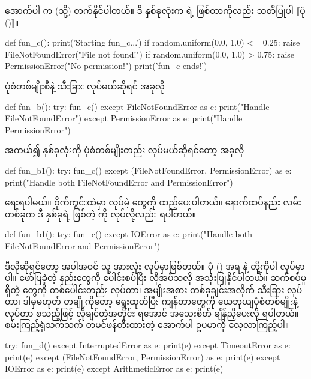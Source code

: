 အောက်ပါ  က  (သို့)  တက်နိုင်ပါတယ်။ ဒီ  နှစ်ခုလုံးက  ရဲ့  ဖြစ်တာကိုလည်း သတိပြုပါ $\big\llbracket$ပုံ (\fRefNo{\ref{fig:exceptionhier}})$\big\rrbracket$။
%
\begin{py}
def fun_c():
    print('Starting fun_c...')
    if random.uniform(0.0, 1.0) <= 0.25:
        raise FileNotFoundError("File not found!")
    if random.uniform(0.0, 1.0) > 0.75:
        raise PermissionError("No permission!")
    print('fun_c ends!')
\end{py}
%
ပုံစံတစ်မျိုးစီနဲ့ သီးခြား  လုပ်မယ်ဆိုရင် အခုလို 
%
\begin{py}
def fun_b():
    try:
        fun_c()
    except FileNotFoundError as e:
        print("Handle FileNotFoundError")
    except PermissionError as e:
        print("Handle PermissionError")
\end{py}
%
အကယ်၍  နှစ်ခုလုံးကို ပုံစံတစ်မျိုးတည်း  လုပ်မယ်ဆိုရင်တော့ အခုလို
%
\begin{py}
def fun_b1():
    try:
        fun_c()
    except (FileNotFoundError, PermissionError) as e:
        print("Handle both FileNotFoundError and PermissionError")
\end{py}
%
ရေးရပါမယ်။ ဝိုက်ကွင်းထဲမှာ  လုပ်မဲ့  တွေကို ထည့်ပေးပါတယ်။ နောက်ထပ်နည်း လမ်းတစ်ခုက ဒီ  နှစ်ခုရဲ့  ဖြစ်တဲ့  ကို  လုပ်လို့လည်း ရပါတယ်။
%
\begin{py}
def fun_b1():
    try:
        fun_c()
    except IOError as e:
        print("Handle both FileNotFoundError and PermissionError")
\end{py}
%
ဒီလိုဆိုရင်တော့  အပါအဝင် သူ့   အားလုံး  လုပ်မှာဖြစ်တယ်။ ပုံ (\fRefNo{\ref{fig:exceptionhier}})  အရ  နဲ့  တို့ကိုပါ  လုပ်မှာပါ။ ဖော်ပြခဲ့တဲ့  နည်းတွေကို ပေါင်းစပ်ပြီး လိုအပ်သလို အသုံးပြုနိုင်ပါတယ်။ ဆက်စပ်မှု ရှိတဲ့  တွေကို တစ်ပေါင်းတည်း  လုပ်တာ၊ အမျိုးအစား တစ်ခုချင်းအလိုက် သီးခြား  လုပ်တာ၊ ဒါမှမဟုတ် တချို့ကိုတော့ ရွေးထုတ်ပြီး ကျန်တာတွေကို ယေဘုယျပုံစံတစ်မျိုးနဲ့  လုပ်တာ စသည့်ဖြင့် လိုချင်တဲ့အတိုင်း ရအောင် အသေးစိတ် ချိန်ညှိပေးလို့ ရပါတယ်။ စမ်းကြည့်ရုံသက်သက် တမင်ဖန်တီးထားတဲ့ အောက်ပါ ဥပမာကို လေ့လာကြည့်ပါ။
%
%
\begin{py}
try:
    fun_d()
except InterruptedError as e:
    print(e)
except TimeoutError as e:
    print(e)
except (FileNotFoundError, PermissionError) as e:
    print(e)
except IOError as e:
    print(e)
except ArithmeticError as e:
    print(e)
\end{py}
